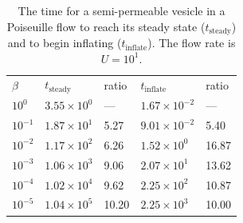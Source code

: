 \documentclass[9pt,twocolumn,twoside,lineno]{pnas-new}
\begin{document}
\begin{table}[htp]
  \centering
  \caption{\label{tbl:parabolicRelaxTimes2} The time for a
  semi-permeable vesicle in a Poiseuille flow to reach its steady state
  ($t_\mathrm{steady}$) and to begin inflating ($t_\mathrm{inflate}$).
  The flow rate is $U = 10^{1}$.}
  \begin{tabular}{C{0.8cm}C{2cm}C{0.8cm}C{2cm}C{0.8cm}}
    \midrule
    $\beta$ & $t_\mathrm{steady}$ & ratio & $t_\mathrm{inflate}$ & ratio \\
    $10^{0}$  & $3.55 \times 10^{0}$ & ---  
              & $1.67 \times 10^{-2}$ & --- \\ 
    $10^{-1}$ & $1.87 \times 10^{1}$ & 5.27 & 
                $9.01 \times 10^{-2}$ & 5.40 \\
    $10^{-2}$ & $1.17 \times 10^{2}$ & 6.26 & 
                $1.52 \times 10^{0}$ & 16.87 \\
    $10^{-3}$ & $1.06 \times 10^{3}$ & 9.06 & 
                $2.07 \times 10^{1}$ & 13.62 \\
    $10^{-4}$ & $1.02 \times 10^{4}$ & 9.62 & 
                $2.25 \times 10^{2}$ & 10.87 \\
    $10^{-5}$ & $1.04 \times 10^{5}$ & 10.20 & 
                $2.25 \times 10^{3}$ & 10.00 \\
    \bottomrule
  \end{tabular}
\end{table}





% 
 
\end{document}
